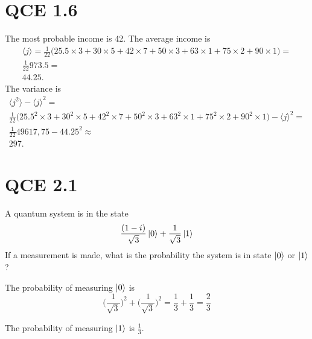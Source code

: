 \documentclass[10pt]{article}
\begin{document}
\section*{QCE 1.6}
The most probable income is 42. The average income is 
\begin{align*}
\langle j \rangle = \frac{1}{22} \Bigg( 25.5 \times 3 + 30 \times 5 + 42 \times 7 + 50 \times 3 + 63 \times 1 + 75 \times 2 + 90 \times 1 \Bigg)  = \\
\frac{1}{22} 973.5 = \\
44.25.
\end{align*}
The variance is
\begin{align*}
\langle j^2 \rangle - \langle j \rangle^2 = \\
\frac{1}{22} \Bigg( 25.5^2 \times 3 + 30^2 \times 5 + 42^2 \times 7 + 50^2 \times 3 + 63^2 \times 1 + 75^2 \times 2 + 90^2 \times 1 \Bigg) - \langle j \rangle^2 = \\
\frac{1}{22} 49 617,75 - 44.25^2 \approx \\
297.
\end{align*}

\section*{QCE 2.1}
A quantum system is in the state
\[
\frac{(1 - i)}{\sqrt{3}} \ket{0} + \frac{1}{\sqrt{3}} \ket{1}
\]
If a measurement is made, what is the probability the system is in state $\ket{0}$ or $\ket{1}$?

The probability of measuring $\ket{0}$ is
\[
\Bigg( \frac{1}{\sqrt{3}} \Bigg)^2 + \Bigg( \frac{1}{\sqrt{3}} \Bigg)^2 = \frac{1}{3} + \frac{1}{3} = \frac{2}{3}
\]

The probability of measuring $\ket{1}$ is $\frac{1}{3}$.
\end{document}
